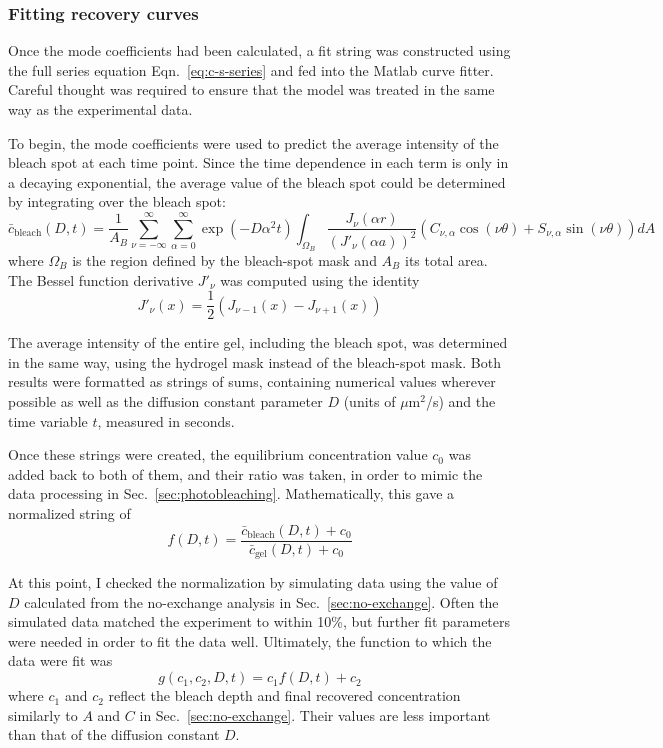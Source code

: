 \subsubsection{Fitting recovery curves}

Once the mode coefficients had been calculated, a fit string was constructed using the full series equation Eqn.~\ref{eq:c-s-series} and fed into the Matlab curve fitter.  Careful thought was required to ensure that the model was treated in the same way as the experimental data.

To begin, the mode coefficients were used to predict the average intensity of the bleach spot at each time point.  Since the time dependence in each term is only in a decaying exponential, the average value of the bleach spot could be determined by integrating over the bleach spot:
\begin{equation}
\bar{c}_\mathrm{bleach}(D,t) = \frac{1}{A_B}\sum_{\nu=-\infty}^{\infty} \sum_{\alpha = 0}^\infty   \exp\left(-D\alpha^2t\right)\int_{\Omega_B}\frac{J_\nu\left(\alpha r\right)}{\left(J'_\nu (\alpha a)\right)^2} \left(C_{\nu,\alpha}\cos(\nu\theta) + S_{\nu,\alpha} \sin(\nu\theta)\right) dA
\label{eq:c-s-series}
\end{equation}
where $\Omega_B$ is the region defined by the bleach-spot mask and $A_B$ its total area.  The Bessel function derivative $J'_\nu$ was computed using the identity
\begin{equation*}
J'_\nu(x) = \frac{1}{2}\left(J_{\nu-1}(x) - J_{\nu+1}(x)\right)
\end{equation*}

The average intensity of the entire gel, including the bleach spot, was determined in the same way, using the hydrogel mask instead of the bleach-spot mask.  Both results were formatted as strings of sums, containing numerical values wherever possible as well as the diffusion constant parameter $D$ (units of $\mu$m$^2$/s)  and the time variable $t$, measured in seconds.

Once these strings were created, the equilibrium concentration value $c_0$ was added back to both of them, and their ratio was taken, in order to mimic the data processing in Sec.~\ref{sec:photobleaching}.  Mathematically, this gave a normalized string of
\begin{equation}
f(D,t) = \frac{\bar{c}_\mathrm{bleach}(D,t)+c_0}{\bar{c}_\mathrm{gel}(D,t)+c_0}
\end{equation}

At this point, I checked the normalization by simulating data using the value of $D$ calculated from the no-exchange analysis in Sec.~\ref{sec:no-exchange}.  Often the simulated data matched the experiment to within 10\%, but further fit parameters were needed in order to fit the data well.  Ultimately, the function to which the data were fit was
\begin{equation}
g(c_1,c_2,D,t) = c_1f(D,t) + c_2
\end{equation}
where $c_1$ and $c_2$ reflect the bleach depth and final recovered concentration similarly to $A$ and $C$ in Sec.~\ref{sec:no-exchange}.  Their values are less important than that of the diffusion constant $D$.

